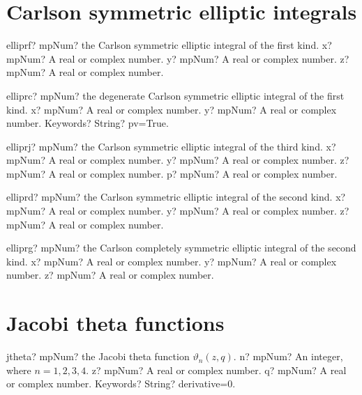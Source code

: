 \documentclass[12pt,a4paper,openany]{book}
\begin{document}
\section{Carlson symmetric elliptic integrals}

\begin{mpFunctionsExtract}
\mpFunctionThree
{elliprf? mpNum? the Carlson symmetric elliptic integral of the first kind.}
{x? mpNum? A real or complex number.}
{y? mpNum? A real or complex number.}
{z? mpNum? A real or complex number.}
\end{mpFunctionsExtract}

\begin{mpFunctionsExtract}
\mpFunctionThree
{elliprc? mpNum? the degenerate Carlson symmetric elliptic integral of the first kind.}
{x? mpNum? A real or complex number.}
{y? mpNum? A real or complex number.}
{Keywords? String? pv=True.}
\end{mpFunctionsExtract}

\begin{mpFunctionsExtract}
\mpFunctionFour
{elliprj? mpNum? the Carlson symmetric elliptic integral of the third kind.}
{x? mpNum? A real or complex number.}
{y? mpNum? A real or complex number.}
{z? mpNum? A real or complex number.}
{p? mpNum? A real or complex number.}
\end{mpFunctionsExtract}

\begin{mpFunctionsExtract}
\mpFunctionThree
{elliprd? mpNum? the Carlson symmetric elliptic integral of the second kind.}
{x? mpNum? A real or complex number.}
{y? mpNum? A real or complex number.}
{z? mpNum? A real or complex number.}
\end{mpFunctionsExtract}

\begin{mpFunctionsExtract}
\mpFunctionThree
{elliprg? mpNum? the Carlson completely symmetric elliptic integral of the second kind.}
{x? mpNum? A real or complex number.}
{y? mpNum? A real or complex number.}
{z? mpNum? A real or complex number.}
\end{mpFunctionsExtract}

\section{Jacobi theta functions}

\begin{mpFunctionsExtract}
\mpFunctionFour
{jtheta? mpNum? the Jacobi theta function $\vartheta_n(z,q)$.}
{n? mpNum? An integer, where $n=1,2,3,4$.}
{z? mpNum? A real or complex number.}
{q? mpNum? A real or complex number.}
{Keywords? String? derivative=0.}
\end{mpFunctionsExtract}
\end{document}
